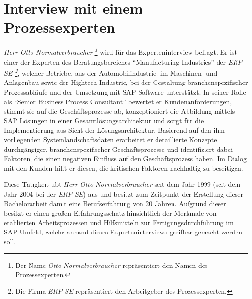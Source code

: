 \tocless\section{Interview mit einem Prozessexperten}\label{ah:interviewCON}

\textit{Herr Otto Normalverbraucher \footnote{Der Name \textit{Otto Normalverbraucher} repräsentiert den Namen des Prozessexperten.}} wird für das Experteninterview befragt.
Er ist einer der Experten des Beratungsbereiches \enquote{Manufacturing Industries} der \textit{ERP SE \footnote{Die Firma \textit{ERP SE} repräsentiert den Arbeitgeber des Prozessexperten.}}, welcher Betriebe, aus der Automobilindustrie, im Maschinen- und Anlagenbau sowie der Hightech Industrie, bei der Gestaltung branchenspezifischer Prozessabläufe und der Umsetzung mit SAP-Software unterstützt.
In seiner Rolle als \enquote{Senior Business Process Consultant} bewertet er Kundenanforderungen, stimmt sie auf die Geschäftsprozesse ab, konzeptioniert die Abbildung mittels SAP Lösungen in einer Gesamtlösungsarchitektur und sorgt für die Implementierung aus Sicht der Lösungsarchitektur.
Basierend auf den ihm vorliegenden Systemlandschaftsdaten erarbeitet er detaillierte Konzepte durchgängiger, branchenspezifischer Geschäftsprozesse und identifiziert dabei Faktoren, die einen negativen Einfluss auf den Geschäftsprozess haben.
Im Dialog mit den Kunden hilft er diesen, die kritischen Faktoren nachhaltig zu beseitigen. 
 
Diese Tätigkeit übt \textit{Herr Otto Normalverbraucher} seit dem Jahr 1999 (seit dem Jahr 2004 bei der \textit{ERP SE}) aus und besitzt zum Zeitpunkt der Erstellung dieser Bachelorarbeit damit eine Berufserfahrung von 20 Jahren.
Aufgrund dieser besitzt er einen großen Erfahrungsschatz hinsichtlich der Merkmale von etablierten Arbeitsprozessen und Hilfsmitteln zur Fertigungsdurchführung im SAP-Umfeld, welche anhand dieses Experteninterviews greifbar gemacht werden soll.


